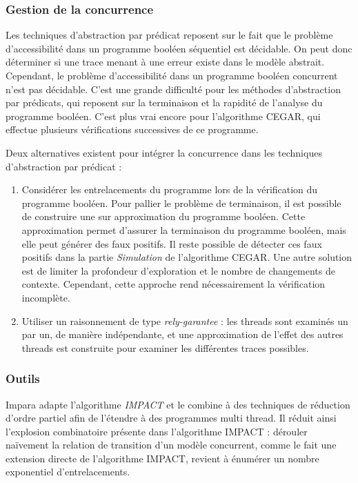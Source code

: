 \subsubsection{Gestion de la concurrence}

Les techniques d'abstraction par prédicat reposent sur le fait que le problème
d'accessibilité dans un programme booléen séquentiel est décidable. On peut donc
déterminer si une trace menant à une erreur existe dans le modèle abstrait.
Cependant, le problème d'accessibilité dans un programme booléen concurrent
n'est pas décidable. C'est une grande difficulté pour les méthodes
d'abstraction par prédicats, qui reposent sur la terminaison et la rapidité de
l'analyse du programme booléen. C'est plus vrai encore pour l'algorithme \ac{CEGAR},
qui effectue plusieurs vérifications successives de ce programme.

Deux alternatives existent pour intégrer la concurrence dans les techniques
d'abstraction par prédicat :

\begin{enumerate}
\def\labelenumi{\arabic{enumi})}
\item
  Considérer les entrelacements du programme lors de la vérification du
  programme booléen. Pour pallier le problème de terminaison, il est
  possible de construire une sur approximation du programme booléen.
  Cette approximation permet d'assurer la terminaison du programme
  booléen, mais elle peut générer des faux positifs. Il reste possible
  de détecter ces faux positifs dans la partie \emph{Simulation} de
  l'algorithme \ac{CEGAR}\cite{predicate_abstraction_over_approximation}.
  Une autre solution est de limiter la profondeur d'exploration et le
  nombre de changements de contexte. Cependant, cette approche rend
  nécessairement la vérification incomplète.
\item
  Utiliser un raisonnement de type
  \emph{rely-garantee}\cite{thread_modular_abstraction} : les
  threads sont examinés un par un, de manière indépendante, et une approximation
  de l'effet des autres threads est construite pour examiner les différentes
  traces possibles.
\end{enumerate}

\subsubsection{Outils}

Impara\cite{Impara} adapte l'algorithme \emph{IMPACT}\cite{IMPACT} et le combine
à des techniques de réduction d'ordre partiel afin de l'étendre à des programmes
multi thread. Il réduit ainsi l'explosion combinatoire présente dans l'algorithme
IMPACT : dérouler naïvement la relation de transition d'un modèle concurrent,
comme le fait une extension directe de l'algorithme IMPACT, revient à
énumérer un nombre exponentiel d'entrelacements.

